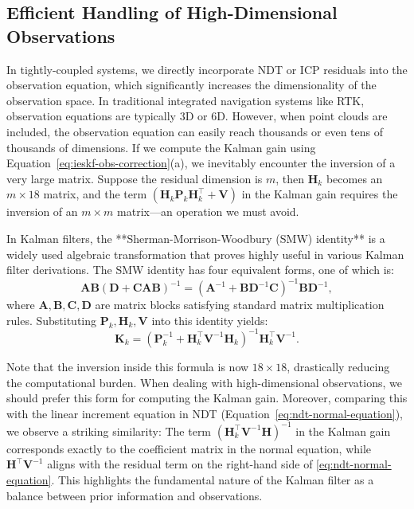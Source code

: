 \subsection{Efficient Handling of High-Dimensional Observations}  

In tightly-coupled systems, we directly incorporate NDT or ICP residuals into the observation equation, which significantly increases the dimensionality of the observation space. In traditional integrated navigation systems like RTK, observation equations are typically 3D or 6D. However, when point clouds are included, the observation equation can easily reach thousands or even tens of thousands of dimensions. If we compute the Kalman gain using Equation~\eqref{eq:ieskf-obs-correction}(a), we inevitably encounter the inversion of a very large matrix. Suppose the residual dimension is \( m \), then \(\bm{H}_k\) becomes an \( m \times 18 \) matrix, and the term \((\bm{H}_k \bm{P}_{k} \bm{H}_k^\top + \bm{V})\) in the Kalman gain requires the inversion of an \( m \times m \) matrix—an operation we must avoid.  

In Kalman filters, the **Sherman-Morrison-Woodbury (SMW) identity** \cite{Sherman1950,Barfoot2016} is a widely used algebraic transformation that proves highly useful in various Kalman filter derivations. The SMW identity has four equivalent forms, one of which is:  
\begin{equation}\label{key}  
	\bm{A} \bm{B} (\bm{D} + \bm{C} \bm{A} \bm{B})^{-1} = (\bm{A}^{-1} + \bm{B} \bm{D}^{-1} \bm{C})^{-1} \bm{B} \bm{D}^{-1},  
\end{equation}  
where \(\bm{A}, \bm{B}, \bm{C}, \bm{D}\) are matrix blocks satisfying standard matrix multiplication rules. Substituting \(\bm{P}_k, \bm{H}_k, \bm{V}\) into this identity yields:  
\begin{equation}\label{eq:8.11}  
	\bm{K}_k  = (\bm{P}_k^{-1} + \bm{H}_k^\top \bm{V}^{-1} \bm{H}_k)^{-1} \bm{H}_k^\top \bm{V}^{-1}.  
\end{equation}  

Note that the inversion inside this formula is now \( 18 \times 18 \), drastically reducing the computational burden. When dealing with high-dimensional observations, we should prefer this form for computing the Kalman gain. Moreover, comparing this with the linear increment equation in NDT (Equation~\eqref{eq:ndt-normal-equation}), we observe a striking similarity: The term \((\bm{H}_k^\top \bm{V}^{-1} \bm{H})^{-1}\) in the Kalman gain corresponds exactly to the coefficient matrix in the normal equation, while \(\bm{H}^\top \bm{V}^{-1}\) aligns with the residual term on the right-hand side of \eqref{eq:ndt-normal-equation}. This highlights the fundamental nature of the Kalman filter as a balance between prior information and observations.  

